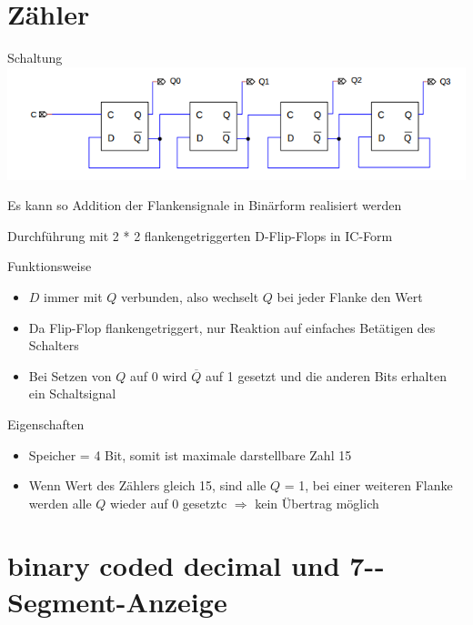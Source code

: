 \documentclass[compress,11pt]{beamer}
\begin{document}
\section{Zähler}
\begin{frame}
\begin{block}{Schaltung}
\includegraphics[scale=0.6]{zahler}
\end{block}
Es kann so Addition der Flankensignale in Binärform realisiert werden
\end{frame}
\begin{frame}

Durchführung mit 2 * 2 flankengetriggerten D-Flip-Flops in IC-Form

\begin{block}{Funktionsweise}
\begin{itemize}
\item $D$ immer mit $Q$ verbunden, also wechselt $Q$ bei jeder Flanke den Wert
\item Da Flip-Flop flankengetriggert, nur Reaktion auf einfaches Betätigen des Schalters
\item Bei Setzen von $Q$ auf 0 wird $\overline{Q}$ auf 1 gesetzt und die anderen Bits erhalten ein Schaltsignal
\end{itemize}
\end{block}
\end{frame}
\begin{frame}
\begin{block}{Eigenschaften}
\begin{itemize}
\item Speicher = 4 Bit, somit ist maximale darstellbare Zahl 15
\item Wenn Wert des Zählers gleich 15, sind alle $Q$ = 1, bei einer weiteren Flanke werden alle $Q$ wieder auf 0 gesetztc $\Rightarrow$ kein Übertrag möglich
\end{itemize}
\end{block}
\end{frame}

\section{binary coded decimal und 7-­Segment­-Anzeige}
\end{document}
